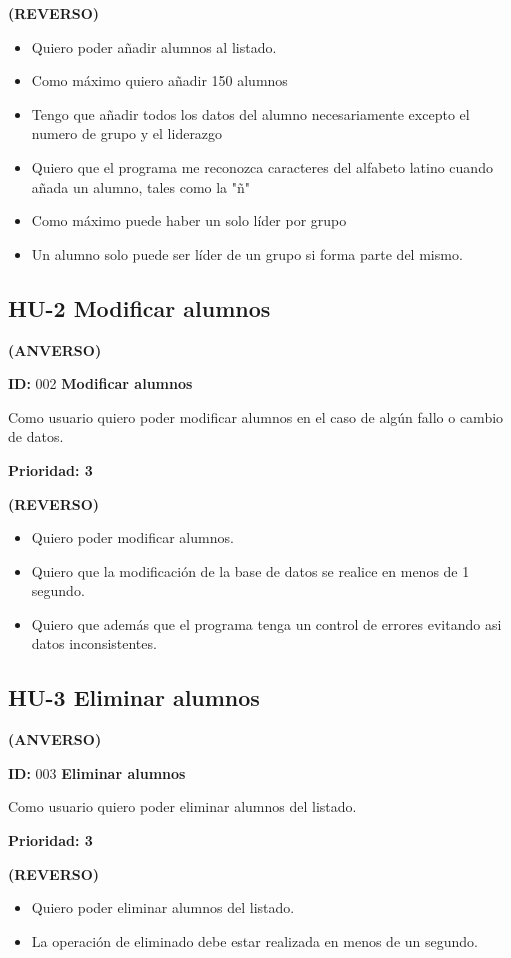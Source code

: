 \textbf{(REVERSO)}
\begin{itemize}
	\item Quiero poder añadir alumnos al listado.
	\item Como máximo quiero añadir 150 alumnos
	\item Tengo que añadir todos los datos del alumno necesariamente excepto el numero de grupo y el liderazgo
	\item Quiero que el programa me reconozca caracteres del alfabeto latino cuando añada un alumno, tales como la "ñ"
	\item Como máximo puede haber un solo líder por grupo
	\item Un alumno solo puede ser líder de un grupo si forma parte del mismo.
\end{itemize}

\newpage
\subsection{HU-2 Modificar alumnos}
\textbf{(ANVERSO)}

\textbf{ID:} 002 \textbf{Modificar alumnos}

Como usuario quiero poder modificar alumnos en el caso de algún fallo o cambio de datos. 

\textbf{Prioridad: 3}

\textbf{(REVERSO)}
\begin{itemize}
	\item Quiero poder modificar alumnos.
	\item Quiero que la modificación de la base de datos se realice en menos de 1 segundo.
	\item Quiero que además que el programa tenga un control de errores evitando asi datos inconsistentes.
\end{itemize}

\subsection{HU-3 Eliminar alumnos}
\textbf{(ANVERSO)}

\textbf{ID:} 003 \textbf{Eliminar alumnos}

Como usuario quiero poder eliminar alumnos del listado.

\textbf{Prioridad: 3}

\textbf{(REVERSO)}
\begin{itemize}
	\item Quiero poder eliminar alumnos del listado.
	\item La operación de eliminado debe estar realizada en menos de un segundo.	
\end{itemize}

